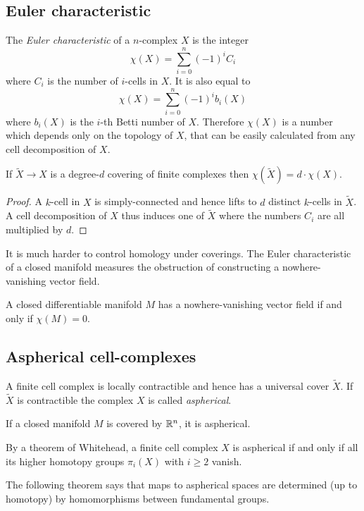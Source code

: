 \subsection{Euler characteristic}
The \emph{Euler characteristic} of a $n$-complex $X$ is the integer  
$$\chi (X) = \sum_{i=0}^n (-1)^i C_i$$
where $C_i$ is the number of $i$-cells in $X$. It is also equal to 
$$\chi(X) = \sum_{i=0}^n (-1)^i b_i(X)$$
where $b_i(X)$ is the $i$-th Betti number of $X$. Therefore $\chi(X)$ is a number which depends only on the topology of $X$, that can be easily calculated from any cell decomposition of $X$.

\begin{prop} If $\tilde X \to X$ is a degree-$d$ covering of finite complexes then $\chi(\tilde X) = d\cdot \chi(X)$.
\end{prop}
\begin{proof}
A $k$-cell in $X$ is simply-connected and hence lifts to $d$ distinct $k$-cells in $\tilde X$. A cell decomposition of $X$ thus induces one of $\tilde X$ where the numbers $C_i$ are all multiplied by $d$.
\end{proof}

It is much harder to control homology under coverings. The Euler characteristic of a closed manifold measures the obstruction of constructing a nowhere-vanishing vector field.

\begin{teo} A closed differentiable manifold $M$ has a nowhere-vanishing vector field if and only if $\chi(M)=0$.
\end{teo}

\subsection{Aspherical cell-complexes}
A finite cell complex is locally contractible and hence has a universal cover $\tilde X$. If $\tilde X$ is contractible the complex  $X$ is called \emph{aspherical}. 

\begin{example}
If a closed manifold $M$ is covered by $\mathbb{R}^n$, it is aspherical. 
\end{example}

By a theorem of Whitehead, a finite cell complex $X$ is aspherical if and only if all its higher homotopy groups $\pi_i(X)$ with $i\geqslant 2$ vanish.

The following theorem says that maps to aspherical spaces are determined (up to homotopy) by homomorphisms between fundamental groups.

